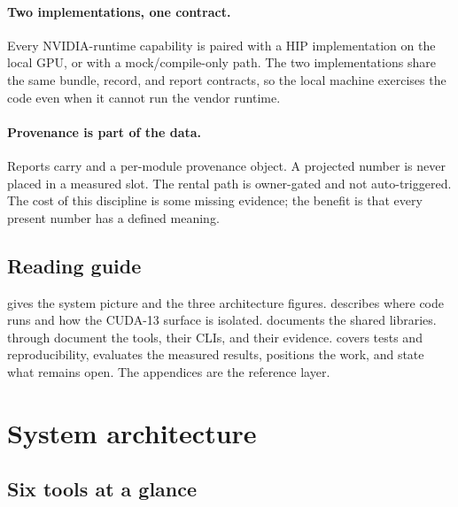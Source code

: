 \documentclass[11pt,twoside,a4paper]{article}
\newcommand{\kst}[1]{\texttt{\detokenize{#1}}}
\begin{document}
\paragraph{Two implementations, one contract.}
Every NVIDIA-runtime capability is paired with a HIP implementation on the
local GPU, or with a mock/compile-only path. The two implementations share the
same bundle, record, and report contracts, so the local machine exercises the
code even when it cannot run the vendor runtime.

\paragraph{Provenance is part of the data.}
Reports carry \kst{schema_version} and a per-module provenance object. A
projected number is never placed in a measured slot. The rental path is
owner-gated and not auto-triggered. The cost of this discipline is some
missing evidence; the benefit is that every present number has a defined
meaning.

\subsection{Reading guide}
\label{sec:reading}

 gives the system picture and the three architecture figures.
 describes where code runs and how the CUDA-13 surface is
isolated.  documents the shared libraries. 
through  document the tools, their CLIs, and their
evidence.  covers tests and reproducibility,
 evaluates the measured results,  positions the
work, and  state what remains open. The appendices
are the reference layer.

\section{System architecture}
\label{sec:arch}

\subsection{Six tools at a glance}
\label{sec:tools-glance}
\end{document}

